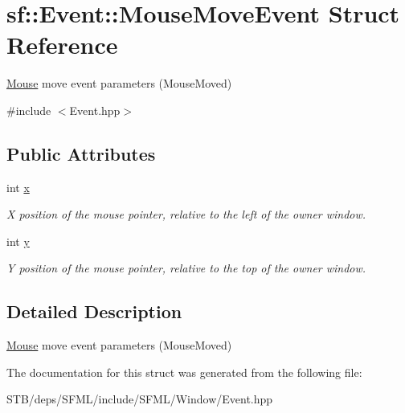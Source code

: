 \hypertarget{structsf_1_1_event_1_1_mouse_move_event}{\section{sf\+:\+:Event\+:\+:Mouse\+Move\+Event Struct Reference}
\label{structsf_1_1_event_1_1_mouse_move_event}
}


\hyperlink{classsf_1_1_mouse}{Mouse} move event parameters (Mouse\+Moved)  




{\ttfamily \#include $<$Event.\+hpp$>$}

\subsection*{Public Attributes}
\begin{DoxyCompactItemize}
\item 
\hypertarget{structsf_1_1_event_1_1_mouse_move_event_aa3a23809afb905cbb52c66d8512e21fd}{int \hyperlink{structsf_1_1_event_1_1_mouse_move_event_aa3a23809afb905cbb52c66d8512e21fd}{x}}\label{structsf_1_1_event_1_1_mouse_move_event_aa3a23809afb905cbb52c66d8512e21fd}

\begin{DoxyCompactList}\small\item\em X position of the mouse pointer, relative to the left of the owner window. \end{DoxyCompactList}\item 
\hypertarget{structsf_1_1_event_1_1_mouse_move_event_a86d78a2fba5b3abda16ca059f2392ad4}{int \hyperlink{structsf_1_1_event_1_1_mouse_move_event_a86d78a2fba5b3abda16ca059f2392ad4}{y}}\label{structsf_1_1_event_1_1_mouse_move_event_a86d78a2fba5b3abda16ca059f2392ad4}

\begin{DoxyCompactList}\small\item\em Y position of the mouse pointer, relative to the top of the owner window. \end{DoxyCompactList}\end{DoxyCompactItemize}


\subsection{Detailed Description}
\hyperlink{classsf_1_1_mouse}{Mouse} move event parameters (Mouse\+Moved) 

The documentation for this struct was generated from the following file\+:\begin{DoxyCompactItemize}
\item 
S\+T\+B/deps/\+S\+F\+M\+L/include/\+S\+F\+M\+L/\+Window/Event.\+hpp\end{DoxyCompactItemize}
